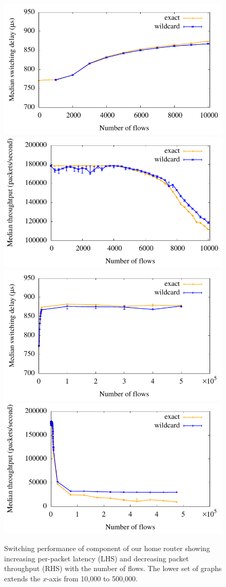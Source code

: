 \begin{figure} \centering
  \includegraphics[width=0.49\columnwidth]{Chapter2/Chapter2Figs/latency-test}
   \includegraphics[width=0.49\columnwidth]{Chapter2/Chapter2Figs/throughput-test}
  \includegraphics[width=0.49\columnwidth]{Chapter2/Chapter2Figs/latency-large-test}
   \includegraphics[width=0.49\columnwidth]{Chapter2/Chapter2Figs/throughput-large-test}
  \caption{\label{f:performance}Switching performance of \ovs component
    of our home router showing increasing per-packet latency (LHS) and
    decreasing packet throughput (RHS) with the number of flows.  The lower set
    of graphs extends the $x$-axis from 10,000 to 500,000.}
\end{figure}

